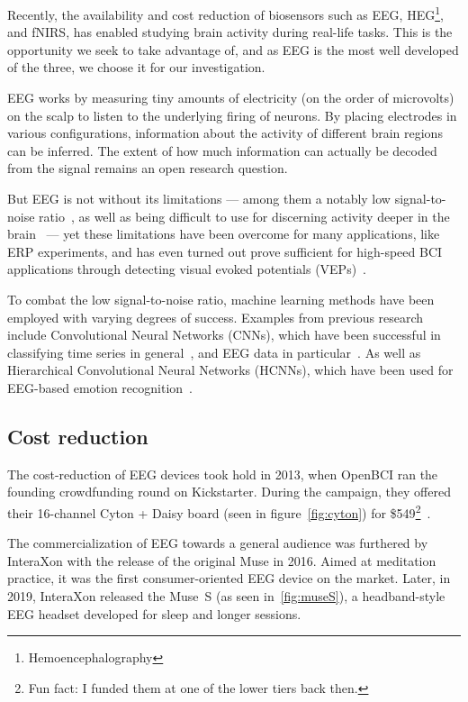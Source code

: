     Recently, the availability and cost reduction of biosensors such as EEG, HEG\footnote{Hemoencephalography}, and fNIRS, has enabled studying brain activity during real-life tasks. This is the opportunity we seek to take advantage of, and as EEG is the most well developed of the three, we choose it for our investigation.

    EEG works by measuring tiny amounts of electricity (on the order of microvolts) on the scalp to listen to the underlying firing of neurons. By placing electrodes in various configurations, information about the activity of different brain regions can be inferred. The extent of how much information can actually be decoded from the signal remains an open research question.

    But EEG is not without its limitations --- among them a notably low signal-to-noise ratio~\cite{mcfarland_eeg-based_2017}, as well as being difficult to use for discerning activity deeper in the brain~\cite{fahimi_hnazaee_localization_2020} --- yet these limitations have been overcome for many applications, like ERP experiments, and has even turned out prove sufficient for high-speed BCI applications through detecting visual evoked potentials (VEPs)~\cite{spuler_high-speed_2017}.

    To combat the low signal-to-noise ratio, machine learning methods have been employed with varying degrees of success. Examples from previous research include Convolutional Neural Networks (CNNs), which have been successful in classifying time series in general~\cite{zhao_convolutional_2017}, and EEG data in particular~\cite{schirrmeister_deep_2017}. As well as Hierarchical Convolutional Neural Networks (HCNNs), which have been used for EEG-based emotion recognition~\cite{li_hierarchical_2018}.

    \subsection*{Cost reduction}

    The cost-reduction of EEG devices took hold in 2013, when OpenBCI ran the founding crowdfunding round on Kickstarter. During the campaign, they offered their 16-channel Cyton + Daisy board (seen in figure~\ref{fig:cyton}) for \$549\footnote{Fun fact: I funded them at one of the lower tiers back then.}~\cite{noauthor_openbci_nodate}.

    The commercialization of EEG towards a general audience was furthered by InteraXon with the release of the original Muse in 2016. Aimed at meditation practice, it was the first consumer-oriented EEG device on the market. Later, in 2019, InteraXon released the Muse~S (as seen in~\ref{fig:museS}), a headband-style EEG headset developed for sleep and longer sessions.

